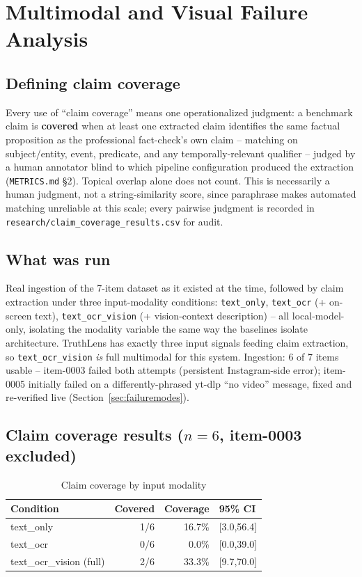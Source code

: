 \documentclass[conference]{IEEEtran}
\begin{document}
\section{Multimodal and Visual Failure Analysis}
\label{sec:multimodalanalysis}

\subsection{Defining claim coverage}
\label{sec:claimcoveragedef}
Every use of ``claim coverage'' means one operationalized judgment: a
benchmark claim is \textbf{covered} when at least one extracted claim
identifies the same factual proposition as the professional fact-check's
own claim -- matching on subject/entity, event, predicate, and any
temporally-relevant qualifier -- judged by a human annotator blind to
which pipeline configuration produced the extraction (\texttt{METRICS.md}
\S2). Topical overlap alone does not count. This is necessarily a human
judgment, not a string-similarity score, since paraphrase makes automated
matching unreliable at this scale; every pairwise judgment is recorded in
\texttt{research/claim\_coverage\_results.csv} for audit.

\subsection{What was run}
Real ingestion of the 7-item dataset as it existed at the time, followed
by claim extraction under three input-modality conditions:
\texttt{text\_only}, \texttt{text\_ocr} (+ on-screen text),
\texttt{text\_ocr\_vision} (+ vision-context description) -- all
local-model-only, isolating the modality variable the same way the
baselines isolate architecture. TruthLens has exactly three input
signals feeding claim extraction, so \texttt{text\_ocr\_vision}
\emph{is} full multimodal for this system. Ingestion: 6 of 7 items
usable -- item-0003 failed both attempts (persistent Instagram-side
error); item-0005 initially failed on a differently-phrased yt-dlp ``no
video'' message, fixed and re-verified live
(Section~\ref{sec:failuremodes}).

\subsection{Claim coverage results ($n=6$, item-0003 excluded)}
\begin{table}[!t]
\caption{Claim coverage by input modality}
\label{tab:coverage}
\centering
\scriptsize
\begin{tabular}{lrrl}
\toprule
Condition & Covered & Coverage & 95\% CI \\
\midrule
text\_only & 1/6 & 16.7\% & [3.0,56.4] \\
text\_ocr & 0/6 & 0.0\% & [0.0,39.0] \\
text\_ocr\_vision (full) & 2/6 & 33.3\% & [9.7,70.0] \\
\bottomrule
\end{tabular}
\end{table}
\end{document}
